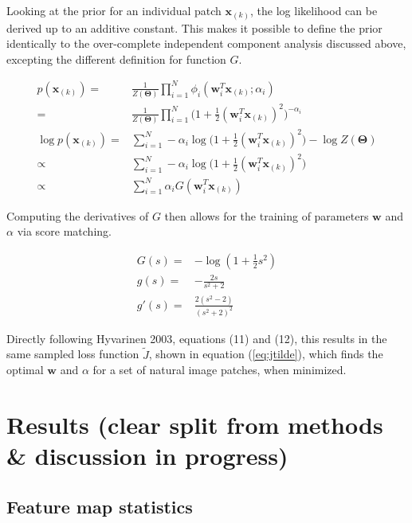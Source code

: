 \documentclass{article}
\begin{document}
Looking at the prior for an individual patch $\mathbf{x}_{(k)}$, the log likelihood can be derived up to an additive constant. This makes it possible to define the prior identically to the over-complete independent component analysis discussed above, excepting the different definition for function $G$. 

\begin{equation}
\begin{aligned}
	p(\mathbf{x}_{(k)}) =& \frac{1}{Z(\bm{\Theta})} \prod_{i=1}^{N} \phi_i (\mathbf{w}_i^T \mathbf{x}_{(k)} ; \alpha_i) \\
	=& \frac{1}{Z(\bm{\Theta})} \prod_{i=1}^{N} \bigg( 1 + \frac{1}{2}(\mathbf{w}_i^T \mathbf{x}_{(k)})^2 \bigg)^{-\alpha_i} \\
	\log p(\mathbf{x}_{(k)}) =& \sum_{i=1}^{N} -\alpha_i \log \bigg( 1 + \frac{1}{2}(\mathbf{w}_i^T \mathbf{x}_{(k)})^2 \bigg)  - \log Z(\bm{\Theta}) \\
	\propto& \sum_{i=1}^{N} -\alpha_i \log \bigg( 1 + \frac{1}{2}(\mathbf{w}_i^T \mathbf{x}_{(k)})^2 \bigg) \\
		\propto& \sum_{i=1}^{N} \alpha_i G(\mathbf{w}_i^T \mathbf{x}_{(k)})
\end{aligned}
\end{equation}

Computing the derivatives of $G$ then allows for the training of parameters $\mathbf{w}$ and $\alpha$ via score matching.


\begin{equation}
\begin{aligned}
	G(s) =& - \log(1 + \frac{1}{2} s^2) \\
	g(s) =& - \frac{2s}{s^2 + 2} \\
	g'(s) =& \frac{2(s^2 - 2)}{(s^2 + 2)^2}
\end{aligned}
\end{equation}

Directly following Hyvarinen 2003, equations (11) and (12), this results in the same sampled loss function $\tilde{J}$, shown in equation (\ref{eq:jtilde}), which finds the optimal $\mathbf{w}$ and $\alpha$ for a set of natural image patches, when minimized.


\section{Results (clear split from methods \& discussion in progress)}

\subsection{Feature map statistics}
\end{document}
